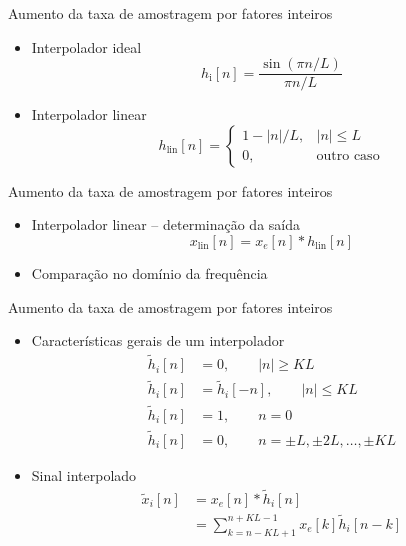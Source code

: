 \begin{slide}{Aumento da taxa de amostragem por fatores inteiros }
	\begin{itemize}
		\item Interpolador ideal
			\begin{equation*}
				h_\text{i}[n] = \frac{\sin (\pi n/L)}{\pi n/L}
			\end{equation*}
		\item Interpolador linear
			\begin{equation*}
				h_\text{lin}[n] = \begin{cases} 1-|n|/L, & |n|\leq L\\ 0, & \text{outro caso} \end{cases}
			\end{equation*}
			\begin{figure}
				\centering
		        \end{figure}
	\end{itemize}
\end{slide}
\begin{slide}{Aumento da taxa de amostragem por fatores inteiros }
	\begin{itemize}
		\item Interpolador linear -- determinação da saída
			\begin{equation*}
				x_\text{lin}[n]=x_e[n]*h_\text{lin}[n]
			\end{equation*}
			\begin{figure}
				\centering
		        \end{figure}
		\item Comparação no domínio da frequência 
			\begin{figure}
				\centering
		        \end{figure}
	\end{itemize}
\end{slide}
\begin{slide}{Aumento da taxa de amostragem por fatores inteiros}
	\begin{itemize}
		\item Características gerais de um interpolador
			\begin{align*}
				\tilde h_i[n]&= 0, \qquad |n|\geq KL\\
				\tilde h_i[n]&= \tilde h_i[-n], \qquad |n|\leq KL\\
				\tilde h_i[n]&= 1, \qquad n=0\\
				\tilde h_i[n]&= 0, \qquad n=\pm L, \pm 2L,\dots, \pm KL
			\end{align*}
		\item Sinal interpolado
			\begin{align*}
				\tilde x_i[n] &= x_e[n] * \tilde h_i[n]\\
				              &= \sum_{k= n-KL+1}^{n+KL-1} x_e[k]\tilde h_i[n-k]
			\end{align*}
	\end{itemize}
\end{slide}
